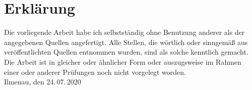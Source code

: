 \chapter*{Erklärung}

Die vorliegende Arbeit habe ich selbstständig ohne Benutzung anderer als der
angegebenen Quellen angefertigt. Alle Stellen, die wörtlich oder sinngemäß
aus veröffentlichten Quellen entnommen wurden, sind als solche
kenntlich gemacht. Die Arbeit ist in gleicher oder ähnlicher Form oder
auszugsweise im Rahmen einer oder anderer Prüfungen noch nicht vorgelegt
worden.
\\[2cm]
Ilmenau, den 24.\,07.\,2020\hfill \namedesautors
